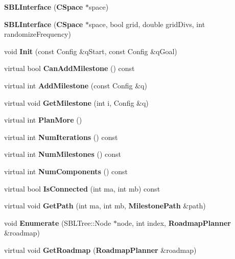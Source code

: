 \begin{DoxyCompactItemize}
\item 
{\bfseries S\+B\+L\+Interface} ({\bf C\+Space} $\ast$space)\label{classSBLInterface_af696f2eb075ad3ac99477d4caa5b7ea3}

\item 
{\bfseries S\+B\+L\+Interface} ({\bf C\+Space} $\ast$space, bool grid, double grid\+Divs, int randomize\+Frequency)\label{classSBLInterface_afc33df95aaa9aa28c7795be70f4d460e}

\item 
void {\bfseries Init} (const Config \&q\+Start, const Config \&q\+Goal)\label{classSBLInterface_a41902b9740721fef100544f8bbf046b1}

\item 
virtual bool {\bfseries Can\+Add\+Milestone} () const \label{classSBLInterface_a0a41d52400a9bbb441f75c7f9798e561}

\item 
virtual int {\bfseries Add\+Milestone} (const Config \&q)\label{classSBLInterface_a5b0968f86076c51885d0e778047a49b2}

\item 
virtual void {\bfseries Get\+Milestone} (int i, Config \&q)\label{classSBLInterface_a8c8cc665a71b443806639a5259e549a6}

\item 
virtual int {\bfseries Plan\+More} ()\label{classSBLInterface_a676a4fc409b7387c76e30c0cd465ccda}

\item 
virtual int {\bfseries Num\+Iterations} () const \label{classSBLInterface_af41870c581eafdfbc48fd8f2e7601e59}

\item 
virtual int {\bfseries Num\+Milestones} () const \label{classSBLInterface_a0f23b1b83a783410af5112f4e5a57423}

\item 
virtual int {\bfseries Num\+Components} () const \label{classSBLInterface_adf31abc8d6efd1e130412d0d31f14bbb}

\item 
virtual bool {\bfseries Is\+Connected} (int ma, int mb) const \label{classSBLInterface_a8ddaea8dbe39145f7f77fc5799b4e996}

\item 
virtual void {\bfseries Get\+Path} (int ma, int mb, {\bf Milestone\+Path} \&path)\label{classSBLInterface_ab740abb21e614cc412b691c80a5b3eb0}

\item 
void {\bfseries Enumerate} (S\+B\+L\+Tree\+::\+Node $\ast$node, int index, {\bf Roadmap\+Planner} \&roadmap)\label{classSBLInterface_a3d4fa8f081896655c562793c78e347ac}

\item 
virtual void {\bfseries Get\+Roadmap} ({\bf Roadmap\+Planner} \&roadmap)\label{classSBLInterface_ac2d66ca5d75a7fa6a55db142360e564a}

\end{DoxyCompactItemize}
